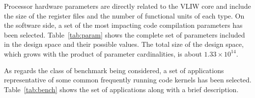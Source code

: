Processor hardware parameters are directly related to the VLIW core
and include the size of the register files and the number of
functional units of each type. On the software side, a set of the most
impacting code compilation parameters has been selected.
Table~\ref{tab:param} shows the complete set of parameters included in
the design space and their possible values. The total size of the design
space, which grows with the product of parameter cardinalities, is
about $1.33 \times 10^{14}$.


As regards the class of benchmark being considered, a set of applications representative of some common
frequently running code kernels has been selected. Table~\ref{tab:bench} shows the set of applications
along with a brief description.



